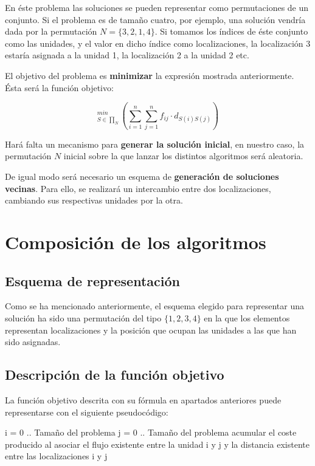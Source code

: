 \documentclass[twoside]{article}
\begin{document}
En éste problema las soluciones se pueden representar como permutaciones de un conjunto. Si el problema es de tamaño cuatro, por ejemplo, una solución vendría dada por la permutación $N=\{3,2,1,4\}$. Si tomamos los índices de éste conjunto como las unidades, y el valor en dicho índice como localizaciones, la localización 3 estaría asignada a la unidad 1, la localización 2 a la unidad 2 etc.

El objetivo del problema es \textbf{minimizar} la expresión mostrada anteriormente. Ésta será la función objetivo:

\begin{displaymath}
_{S\in\prod _N}^{min}\left ( \sum_{i=1}^n \sum_{j=1}^n f_{ij} \cdot d_{S(i)S(j)}  \right )
\end{displaymath}

Hará falta un mecanismo para \textbf{generar la solución inicial}, en nuestro caso, la permutación $N$ inicial sobre la que lanzar los distintos algoritmos será aleatoria.

De igual modo será necesario un esquema de \textbf{generación de soluciones vecinas}. Para ello, se realizará un intercambio entre dos localizaciones, cambiando sus respectivas unidades por la otra.

\section{Composición de los algoritmos}

\subsection{Esquema de representación}

Como se ha mencionado anteriormente, el esquema elegido para representar
una solución ha sido una permutación del tipo $\{1,2,3,4\}$ en la que los
elementos representan localizaciones y la posición que ocupan las unidades
a las que han sido asignadas.

\subsection{Descripción de la función objetivo}

La función objetivo descrita con su fórmula en apartados anteriores puede
representarse con el siguiente pseudocódigo:

\begin{pythoncode}
i = 0 .. Tamaño del problema
    j = 0 .. Tamaño del problema
        acumular el coste producido al asociar el flujo existente entre
        la unidad i y j y la distancia existente entre las localizaciones
        i y j
\end{pythoncode}
\end{document}
